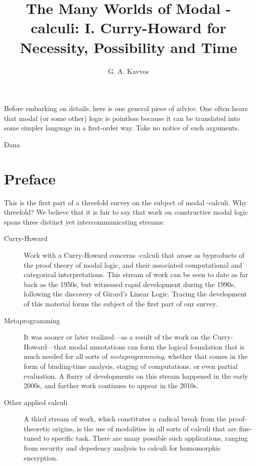 \documentclass[a4paper]{amsart}
\title[The Many Worlds of Modal -calculi: Part I]
{The Many Worlds of Modal -calculi: I. Curry-Howard for
Necessity, Possibility and Time}
\author{G. A. Kavvos}
\begin{document}
\maketitle

\tableofcontents

\textwidth
\epigraph{Before embarking on details, here is one general piece
of advice. One often hears that modal (or some other) logic is
pointless because it can be translated into some simpler language
in a first-order way. Take no notice of such
arguments.}{Dana \cite{Scott1970}}

\pagebreak

\section*{Preface}

This is the first part of a threefold survey on the
subject of modal -calculi. Why threefold? We believe that
it is fair to say that work on constructive modal logic spans
three distinct yet intercommunicating streams:

\begin{description} \item[Curry-Howard] Work with a Curry-Howard
  concerns -calculi that arose as byproducts of the proof
  theory of modal logic, and their associated computational and
  categorical interpretations. This stream of work can be seen to
  date as far back as the 1950s, but witnessed rapid development
  during the 1990s, following the discovery of Girard's Linear
  Logic. Tracing the development of this material forms the
  subject of the first part of our survey.

  \item[Metaprogramming] It was sooner or later realized---as a
  result of the work on the Curry-Howard---that modal annotations
  can form the logical foundation that is much needed for all
  sorts of \emph{metaprogramming}, whether that comes in the form
  of binding-time analysis, staging of computations, or even
  partial evaluation. A flurry of developments on this stream
  happened in the early 2000s, and further work continues to
  appear in the 2010s.

  \item[Other applied calculi] A third stream of work, which
  constitutes a radical break from the proof-theoretic origins, is
  the use of modalities in all sorts of calculi that are
  fine-tuned to specific task. There are many possible such
  applications, ranging from security and depedency analysis to
  calculi for homomorphic encryption.
\end{description}
\end{document}
